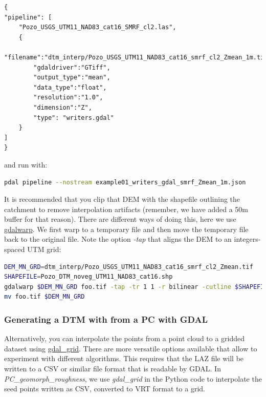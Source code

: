 \documentclass[a4paperpaper,,tablecaptionabove]{scrartcl}
\begin{document}
\begin{lstlisting}
{
"pipeline": [
    "Pozo_USGS_UTM11_NAD83_cat16_SMRF_cl2.las",
    {
        "filename":"dtm_interp/Pozo_USGS_UTM11_NAD83_cat16_smrf_cl2_Zmean_1m.tif",
        "gdaldriver":"GTiff",
        "output_type":"mean",
        "data_type":"float",
        "resolution":"1.0",
        "dimension":"Z",
        "type": "writers.gdal"
    }
]
}
\end{lstlisting}

and run with:

\begin{lstlisting}[language=bash]
pdal pipeline --nostream example01_writers_gdal_smrf_Zmean_1m.json
\end{lstlisting}

It is recommended that you clip that DEM with the shapefile outlining
the catchment to remove interpolation artifacts (remember, we have added
a 50m buffer for that reason). There are different ways of doing this,
here we use \href{https://www.gdal.org/gdalwarp.html}{gdalwarp}. We
first warp to a temporary file and then move the temporary file back to
the original file. Note the option \emph{-tap} that aligns the DEM to an
integers-spaced UTM grid:

\begin{lstlisting}[language=bash]
DEM_MN_GRD=dtm_interp/Pozo_USGS_UTM11_NAD83_cat16_smrf_cl2_Zmean.tif
SHAPEFILE=Pozo_DTM_noveg_UTM11_NAD83_cat16.shp
gdalwarp $DEM_MN_GRD foo.tif -tap -tr 1 1 -r bilinear -cutline $SHAPEFILE -crop_to_cutline -co COMPRESS=DEFLATE -co ZLEVEL=7 -co predictor=3
mv foo.tif $DEM_MN_GRD
\end{lstlisting}

\hypertarget{generating-a-dtm-with-from-a-pc-with-gdal}{%
\subsubsection{Generating a DTM with from a PC with
GDAL}\label{generating-a-dtm-with-from-a-pc-with-gdal}}

Alternatively, you can interpolate the points from a point cloud to a
gridded dataset using
\href{https://www.gdal.org/gdal_grid.html}{gdal\_grid}. There are more
versatile options available that allow to experiment with different
algorithms. This requires that the LAZ file will be written to a CSV or
similar file format that is readable by GDAL. In
\emph{PC\_geomorph\_roughness}, we use \emph{gdal\_grid} in the Python
code to interpolate the seed points written as CSV, converted to VRT
format to a grid.
\end{document}
